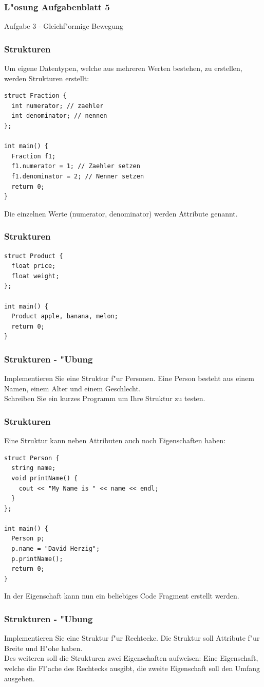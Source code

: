\documentclass{beamer}
\begin{document}
\begin{frame}[fragile]
	\frametitle{L"osung Aufgabenblatt 5}
	Aufgabe 3 - Gleichf"ormige Bewegung
	{\tiny
	
	}
\end{frame}

\begin{frame}[fragile]
	\frametitle{Strukturen}
	Um eigene Datentypen, welche aus mehreren Werten bestehen, zu erstellen, werden
	Strukturen erstellt:
	{\tiny
	\begin{lstlisting}
struct Fraction {
  int numerator; // zaehler
  int denominator; // nennen
};
	
int main() {
  Fraction f1;
  f1.numerator = 1; // Zaehler setzen
  f1.denominator = 2; // Nenner setzen
  return 0;
}
	\end{lstlisting}
	}
	Die einzelnen Werte (numerator, denominator) werden Attribute genannt.
\end{frame}

\begin{frame}[fragile]
	\frametitle{Strukturen}
	\begin{lstlisting}
struct Product {
  float price;
  float weight;
};
	
int main() {
  Product apple, banana, melon;
  return 0;
}
	\end{lstlisting}
\end{frame}

\frame
{
	\frametitle{Strukturen - "Ubung}
	Implementieren Sie eine Struktur f"ur Personen. Eine Person
	besteht aus einem Namen, einem Alter und einem Geschlecht.\\
	Schreiben Sie ein kurzes Programm um Ihre Struktur zu testen.
}

\begin{frame}[fragile]
	\frametitle{Strukturen}
	Eine Struktur kann neben Attributen auch noch Eigenschaften haben:
	{\tiny
	\begin{lstlisting}
struct Person {
  string name;
  void printName() {
    cout << "My Name is " << name << endl;
  }
};
	
int main() {
  Person p;
  p.name = "David Herzig";
  p.printName();
  return 0;
}
	\end{lstlisting}
	}
	In der Eigenschaft kann nun ein beliebiges Code Fragment erstellt werden.
\end{frame}

\frame
{
	\frametitle{Strukturen - "Ubung}
	Implementieren Sie eine Struktur f"ur Rechtecke. Die Struktur soll
	Attribute f"ur Breite und H"ohe haben.\\
	Des weiteren soll die Strukturen zwei Eigenschaften aufweisen:
	Eine Eigenschaft, welche die Fl"ache des Rechtecks ausgibt, die zweite
	Eigenschaft soll den Umfang ausgeben.
}
\end{document}
